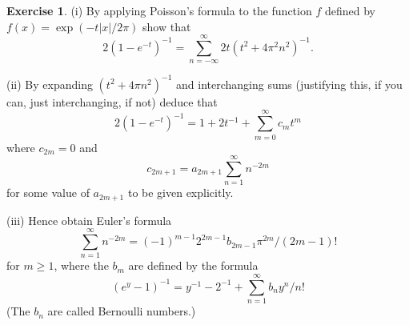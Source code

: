 \documentclass[12pt]{article}
\theoremstyle{definition}
\newtheorem{question}{Exercise}[section]
\begin{document}
\begin{question} (i) By applying Poisson's formula to the function
$f$ defined by $f(x)=\exp(-t|x|/2\pi)$ show that
\[2(1-e^{-t})^{-1}
=\sum_{n=-\infty}^{\infty}2t(t^{2}+4\pi^{2}n^{2})^{-1}.\]

(ii) By expanding $(t^{2}+4\pi n^{2})^{-1}$ and
interchanging sums (justifying this, if you can, just interchanging,
if not) deduce that
\[2(1-e^{-t})^{-1}=1+2t^{-1}+\sum_{m=0}^{\infty}c_{m}t^{m}\]
where $c_{2m}=0$ and
\[c_{2m+1}=a_{2m+1}\sum_{n=1}^{\infty}n^{-2m}\]
for some value of $a_{2m+1}$ to be given explicitly.

(iii) Hence obtain Euler's formula
\[\sum_{n=1}^{\infty}n^{-2m}=
(-1)^{m-1}2^{2m-1}b_{2m-1}\pi^{2m}/(2m-1)!\]
for $m\geq 1$, where the $b_{m}$ are defined by the formula
\[(e^{y}-1)^{-1}=y^{-1}-2^{-1}+\sum_{n=1}^{\infty}b_{n}y^{n}/n!\]
(The $b_{n}$ are called Bernoulli numbers.)
\end{question}
\end{document}
